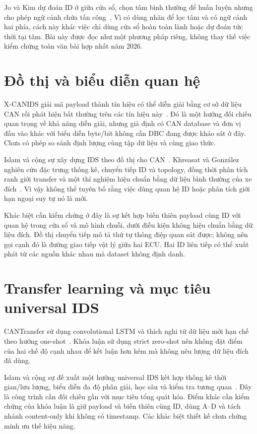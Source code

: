 \documentclass[12pt,a4paper,oneside,openany]{extbook}
\begin{document}
Jo và Kim dự đoán ID ở giữa cửa sổ, chọn tâm bình thường để huấn luyện nhưng cho phép ngữ cảnh chứa tấn công~\cite{jo2025indirect}. Vì có dùng nhãn để lọc tâm và có ngữ cảnh hai phía, cách này khác việc chỉ dùng cửa sổ hoàn toàn lành hoặc dự đoán tức thời tại tâm. Bài này được đọc như một phương pháp riêng, không thay thế việc kiểm chứng toàn văn bài hợp nhất năm 2026.

\section{Đồ thị và biểu diễn quan hệ}
X-CANIDS giải mã payload thành tín hiệu có thể diễn giải bằng cơ sở dữ liệu CAN rồi phát hiện bất thường trên các tín hiệu này~\cite{jeong2024xcanids}. Đó là một hướng đối chiếu quan trọng về khả năng diễn giải, nhưng giả định có CAN database và đơn vị đầu vào khác với biểu diễn byte/bit không cần DBC đang được khảo sát ở đây. Chưa có phép so sánh định lượng cùng tập dữ liệu và cùng giao thức.

Islam và cộng sự xây dựng IDS theo đồ thị cho CAN~\cite{islam2020graph}. Khreasat và González nghiên cứu đặc trưng thống kê, chuyển tiếp ID và topology, đồng thời phân tích ranh giới transfer và một thí nghiệm hiệu chuẩn bằng dữ liệu bình thường của xe đích~\cite{khreasat2026relational}. Vì vậy không thể tuyên bố rằng việc dùng quan hệ ID hoặc phân tích giới hạn ngoại suy tự nó là mới.

Khác biệt cần kiểm chứng ở đây là sự kết hợp biến thiên payload cùng ID với quan hệ trong cửa sổ và mô hình chuỗi, dưới điều kiện không hiệu chuẩn bằng dữ liệu đích. Đồ thị chuyển tiếp mô tả thứ tự thông điệp quan sát được; không nên gọi cạnh đó là đường giao tiếp vật lý giữa hai ECU. Hai ID liên tiếp có thể xuất phát từ các nguồn khác nhau mà dataset không định danh.

\section{Transfer learning và mục tiêu universal IDS}
CANTransfer sử dụng convolutional LSTM và thích nghi từ dữ liệu mới hạn chế theo hướng one-shot~\cite{tariq2020cantransfer}. Khóa luận sử dụng strict zero-shot nên không đặt điểm của hai chế độ cạnh nhau để kết luận hơn kém mà không nêu lượng dữ liệu đích đã dùng.

Islam và cộng sự đề xuất một hướng universal IDS kết hợp thống kê thời gian/lưu lượng, biểu diễn đa độ phân giải, học sâu và kiểm tra tương quan~\cite{s26051489}. Đây là công trình cần đối chiếu gần với mục tiêu tổng quát hóa. Điểm khác cần kiểm chứng của khóa luận là giữ payload và biến thiên cùng ID, dùng A--D và tách nhánh content-only khi không có timestamp. Các khác biệt thiết kế chưa chứng minh ưu thế hiệu năng.
\end{document}
